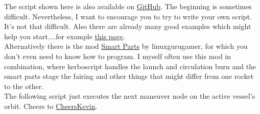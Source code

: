\documentclass[12pt,paper=A4,numbers=noenddot,bibliography=totoc,listof=totoc,DIV=11,BCOR=1mm]{scrreprt}
\begin{document}
\begin{flushleft}
The script shown here is also available on \href{https://github.com/Tornado3P9/kOS_Collection}{GitHub}. The beginning is sometimes difficult. Nevertheless, I want to encourage you to try to write your own script. It's not that difficult. Also there are already many good examples which might help you start....for example \href{https://kos.fandom.com/wiki/KerboScript}{this page}.\\
Alternatively there is the mod \href{https://forum.kerbalspaceprogram.com/index.php?/topic/151340-19x-smart-parts-continued/}{Smart Parts} by linuxgurugamer, for which you don't even need to know how to program. I myself often use this mod in combination, where kerboscript handles the launch and circulation burn and the smart parts stage the fairing and other things that might differ from one rocket to the other.\\
The following script just executes the next maneuver node on the active vessel's orbit. Cheers to \href{https://www.youtube.com/playlist?list=PLb6UbFXBdbCoCm1e65qfDOCdK_qIBtX3D}{CheersKevin}.
\end{flushleft}
\end{document}
